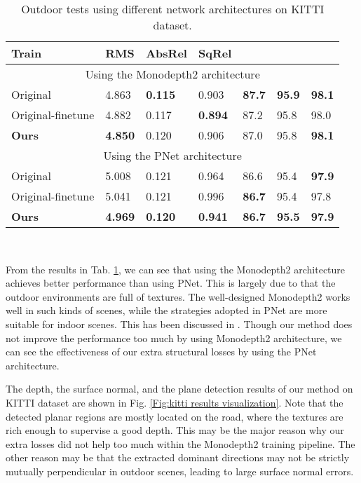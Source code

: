 \documentclass[10pt,twocolumn,letterpaper]{article}
\newcommand{\Tab}[1]{Tab. \ref{#1}}
\begin{document}
\begin{table}[h]
\scriptsize
	\centering
	\begin{tabularx}{0.48\textwidth}{|l|XXX|XXX|}
		\hline
		Train & RMS & AbsRel & SqRel &  &  &  \\
		\hline
		\hline
		\multicolumn{7}{|c|}{Using the Monodepth2 architecture} \\
		\hline
		Original & 4.863 & \textbf{0.115} & 0.903 & \textbf{87.7} & \textbf{95.9}  & \textbf{98.1} \\
		Original-finetune & 4.882 & 0.117 & \textbf{0.894} & 87.2 & 95.8  & 98.0 \\
		\textbf{Ours}  & \textbf{4.850}  & 0.120 & 0.906 & 87.0  & 95.8  & \textbf{98.1} \\
		\hline
		\hline
		\multicolumn{7}{|c|}{Using the PNet architecture} \\
		\hline
		Original & 5.008 & 0.121 & 0.964 &  86.6 &  95.4 & \textbf{97.9} \\
		Original-finetune & 5.041 & 0.121 & 0.996 & \textbf{86.7}  & 95.4  & 97.8  \\
		\textbf{Ours} & \textbf{4.969} & \textbf{0.120} & \textbf{0.941} & \textbf{86.7}  & \textbf{95.5}  & \textbf{97.9} \\
		\hline
	\end{tabularx}
\\
	\caption{Outdoor tests using different network architectures on KITTI dataset. }
	\label{tab:diff baseline KITTI}  
\end{table} 


From the results in \Tab{tab:diff baseline KITTI}, we can see that using
the Monodepth2 \cite{godard2019digging} architecture achieves better performance than using PNet.
This is largely due to that the outdoor environments are full of textures. The well-designed Monodepth2 works well in such kinds of scenes, while the strategies adopted in PNet are more suitable for indoor scenes. This has been discussed in \cite{yu2020p}. Though our method does not improve the performance too much by using Monodepth2 architecture, we can see the effectiveness of our extra structural losses by using the PNet architecture.

The depth, the surface normal, and the plane detection results of our method on KITTI dataset are shown in Fig. \ref{Fig:kitti results visualization}. Note that the detected planar regions are mostly located on the road, where the textures are rich enough to supervise a good depth. This may be the major reason why our extra losses did not help too much within the Monodepth2 training pipeline. The other reason may be that the extracted dominant directions may not be strictly mutually perpendicular in outdoor scenes, leading to large surface normal errors.
\end{document}

